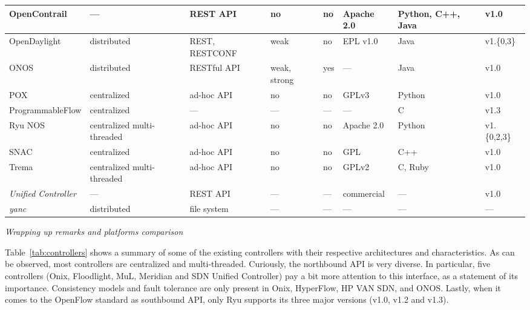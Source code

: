 {\begin{table}[!htp]
\begin{center}
\begin{tabularx}{\linewidth}{p{2.94cm}Xp{2.29cm}p{1.47cm}p{0.75cm}p{1.35cm}p{2.1cm}p{0.9cm}}
OpenContrail~\cite{junipernetworks2013-1} & --- & REST API & no & no & Apache 2.0 & Python, C++, Java & v1.0\\\hline
OpenDaylight~\cite{opendaylight2013} & distributed & REST, RESTCONF & weak & no & EPL v1.0 & Java & v1.\{0,3\} \\\hline
ONOS~\cite{krishnaswamy2013} & distributed & RESTful API & weak, strong & yes & --- & Java & v1.0 \\\hline
POX~\cite{mccauley2012}       & centralized               & ad-hoc API  & no & no & GPLv3 & Python & v1.0 \\\hline
ProgrammableFlow \cite{shimonishi2010} & centralized & --- & --- & --- & --- & C & v1.3 \\\hline
Ryu NOS~\cite{nippontelegraphandtelephonecorporation2012} & centralized multi-threaded & ad-hoc API & no & no & Apache 2.0 & Python & v1.\{0,2,3\}\\\hline
SNAC~\cite{appenzeller2011} & centralized & ad-hoc API & no & no & GPL & C++ & v1.0 \\\hline
Trema~\cite{takamiya2012}      & centralized multi-threaded  & ad-hoc API & no & no & GPLv2 & C, Ruby & v1.0 \\\hline
\textit{Unified Controller}~\cite{racherla2014} & --- & REST API & --- & --- & commercial & --- & v1.0 \\\hline
\textit{yanc}~\cite{monaco2013} & distributed & file system & --- & --- & --- & --- & --- \\\hline
\end{tabularx}
\end{center}
\end{table}
}

\vspace{2mm}
\noindent \textit{Wrapping up remarks and platforms comparison}

Table~\ref{tab:controllers} shows a summary of some of the existing controllers with their respective 
architectures and characteristics.
As can be observed, most controllers are centralized and multi-threaded.
Curiously, the northbound API is very diverse. In particular, five controllers (Onix, Floodlight, MuL, Meridian and SDN Unified Controller) pay a bit more attention to this interface, as a statement
of its importance. Consistency models and fault tolerance are only present in Onix, HyperFlow, HP VAN SDN, 
and ONOS. Lastly, when it comes to the OpenFlow standard as southbound API, only Ryu supports its three 
major versions (v1.0, v1.2 and v1.3).


